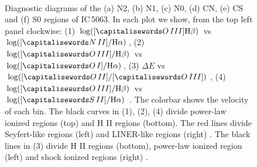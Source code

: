 \documentclass[../thesis.tex]{subfiles}
\begin{document}
\begin{figure}
\\
\caption[]{Diagnostic diagrams of the (a) N2, (b) N1, (c) N0, (d) CN, (e) CS and (f) S0 regions of IC\,5063.  In each plot we show, from the top left panel clockwise: (1) $\log([\ion{O}{III}] \Hb)$ vs $\log([\ion{N}{II}]/ \Ha)$, (2) $\log([\ion{O}{III}]/ \Hb)$ vs $\log([\ion{O}{I}]/ \Ha)$, (3) $\Delta E$ vs $\log([\ion{O}{II}]/[\ion{O}{III}])$, (4) $\log([\ion{O}{III}]/ \Hb)$ vs $\log([\ion{S}{II}]/ \Ha)$ \citep{Baldwin81, Veilleux87}. The colorbar shows the velocity of each bin. The black curves in (1), (2), (4) divide power-law ionized regions (top) and H II regions (bottom). The red lines divide Seyfert-like regions (left) and LINER-like regions (right) \citep{Kewley06}. The black lines in (3) divide H II regions (bottom), power-law ionized region (left) and shock ionized regions (right) \citep{Baldwin81}.  }
\label{fig:diag_css0}
\end{figure}
\end{document}
